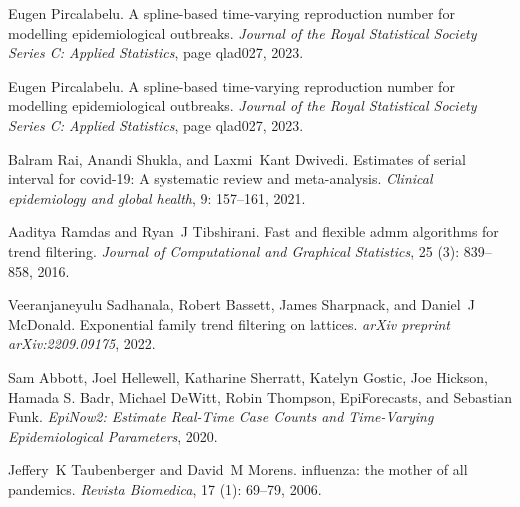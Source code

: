 \documentclass[10pt,letterpaper]{article}
\begin{document}
\begin{thebibliography}{32}
  Eugen Pircalabelu.
  \newblock A spline-based time-varying reproduction number for modelling
    epidemiological outbreaks.
  \newblock \emph{Journal of the Royal Statistical Society Series C: Applied
    Statistics}, page qlad027, 2023{}.
  
  Eugen Pircalabelu.
  \newblock A spline-based time-varying reproduction number for modelling
    epidemiological outbreaks.
  \newblock \emph{Journal of the Royal Statistical Society Series C: Applied
    Statistics}, page qlad027, 2023{}.
  
  Balram Rai, Anandi Shukla, and Laxmi~Kant Dwivedi.
  \newblock Estimates of serial interval for covid-19: A systematic review and
    meta-analysis.
  \newblock \emph{Clinical epidemiology and global health}, 9: 157--161,
    2021.
  
  Aaditya Ramdas and Ryan~J Tibshirani.
  \newblock Fast and flexible admm algorithms for trend filtering.
  \newblock \emph{Journal of Computational and Graphical Statistics}, 25
    (3): 839--858, 2016.
  
  Veeranjaneyulu Sadhanala, Robert Bassett, James Sharpnack, and Daniel~J
    McDonald.
  \newblock Exponential family trend filtering on lattices.
  \newblock \emph{arXiv preprint arXiv:2209.09175}, 2022.
  
  {Sam Abbott}, {Joel Hellewell}, {Katharine Sherratt}, {Katelyn Gostic}, {Joe
    Hickson}, {Hamada S. Badr}, {Michael DeWitt}, {Robin Thompson},
    {EpiForecasts}, and {Sebastian Funk}.
  \newblock \emph{EpiNow2: Estimate Real-Time Case Counts and Time-Varying
    Epidemiological Parameters}, 2020.
  
  Jeffery~K Taubenberger and David~M Morens.
   influenza: the mother of all pandemics.
  \newblock \emph{Revista Biomedica}, 17 (1): 69--79, 2006.
  

\end{thebibliography}
\end{document}
